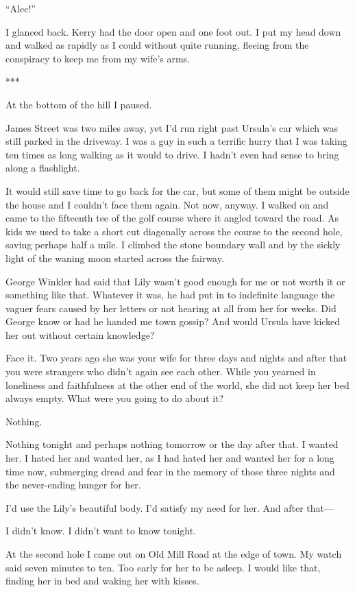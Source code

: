 \documentclass{novel}
\begin{document}
{“Alec!”

I glanced back. Kerry had the door open and one foot out. I put my head down and walked as rapidly as I could without quite running, fleeing from the conspiracy to keep me from my wife’s arms.

***

At the bottom of the hill I paused.

James Street was two miles away, yet I’d run right past Ursula’s car which was still parked in the driveway. I was a guy in such a terrific hurry that I was taking ten times as long walking as it would to drive. I hadn’t even had sense to bring along a flashlight.

It would still save time to go back for the car, but some of them might be outside the house and I couldn’t face them again. Not now, anyway. I walked on and came to the fifteenth tee of the golf course where it angled toward the road. As kids we used to take a short cut diagonally across the course to the second hole, saving perhaps half a mile. I climbed the stone boundary wall and by the sickly light of the waning moon started across the fairway.

George Winkler had said that Lily wasn’t good enough for me or not worth it or something like that. Whatever it was, he had put in to indefinite language the vaguer fears caused by her letters or not hearing at all from her for weeks. Did George know or had he handed me town gossip? And would Ursula have kicked her out without certain knowledge?

Face it. Two years ago she was your wife for three days and nights and after that you were strangers who didn’t again see each other. While you yearned in loneliness and faithfulness at the other end of the world, she did not keep her bed always empty. What were you going to do about it?

Nothing.

Nothing tonight and perhaps nothing tomorrow or the day after that. I wanted her. I hated her and wanted her, as I had hated her and wanted her for a long time now, submerging dread and fear in the memory of those three nights and the never-ending hunger for her.

I’d use the Lily’s beautiful body. I’d satisfy my need for her. And after that—

I didn’t know. I didn’t want to know tonight.

At the second hole I came out on Old Mill Road at the edge of town. My watch said seven minutes to ten. Too early for her to be asleep. I would like that, finding her in bed and waking her with kisses.

}
\end{document}
